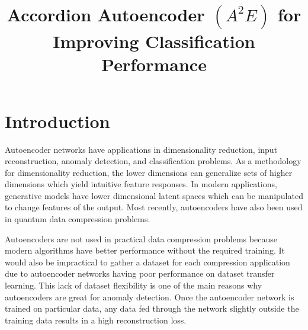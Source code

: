 \documentclass[conference]{IEEEtran}
\begin{document}
\title{Accordion Autoencoder $(A^2E)$ for Improving Classification Performance}

\author{
    \and
    }

\maketitle

\begin{abstract}
\end{abstract}

\begin{IEEEkeywords}
\end{IEEEkeywords}

\section{Introduction}
Autoencoder networks have applications in dimensionality reduction, input reconstruction, anomaly detection, and classification problems. As a methodology for dimensionality reduction, the lower dimensions can generalize sets of higher dimensions which yield intuitive feature responses. In modern applications, generative models have lower dimensional latent spaces which can be manipulated to change features of the output. Most recently, autoencoders have also been used in quantum data compression problems.

Autoencoders are not used in practical data compression problems because modern algorithms have better performance without the required training. It would also be impractical to gather a dataset for each compression application due to autoencoder networks having poor performance on dataset transfer learning. This lack of dataset flexibility is one of the main reasons why autoencoders are great for anomaly detection. Once the autoencoder network is trained on particular data, any data fed through the network slightly outside the training data results in a high reconstruction loss.
\end{document}

